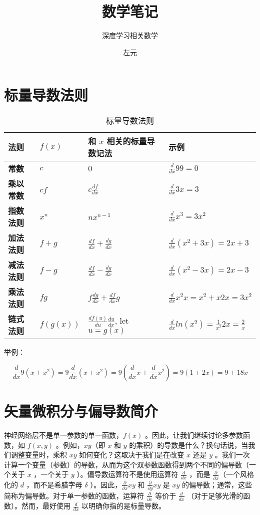 \documentclass[lang=cn,newtx,10pt,scheme=chinese]{elegantbook}
\title{数学笔记}
\subtitle{深度学习相关数学}
\author{左元}
\begin{document}
\maketitle
\frontmatter

\tableofcontents

\mainmatter

\chapter{标量导数法则}

\begin{table}[htbp]
\caption{标量导数法则}
\centering
\begin{tabular}{llll}
\toprule
{\bf 法则}&{\bf $f(x)$}&{\bf 和 $x$ 相关的标量导数记法}&{\bf 示例}\\
\midrule
{\bf 常数}&$c$&$0$&$\frac{d}{dx}99 = 0$\\[0.2em]
{\bf 乘以常数}&$cf$&$c \frac{df}{dx}$&$\frac{d}{dx}3x = 3$\\[0.2em]
{\bf 指数法则}&$x^n$&$nx^{n-1}$&$\frac{d}{dx}x^3 = 3x^2$\\[0.2em]
{\bf 加法法则}&$f + g$&$\frac{df}{dx} + \frac{dg}{dx}$&$\frac{d}{dx} (x^2 + 3x) = 2x + 3$\\[0.2em]
{\bf 减法法则}&$f - g$&$\frac{df}{dx} - \frac{dg}{dx}$&$\frac{d}{dx}(x^2 - 3x) = 2x - 3$\\[0.2em]
{\bf 乘法法则}&$fg$&$f \frac{dg}{dx} + \frac{df}{dx} g$&$\frac{d}{dx}x^2x = x^2 + x2x = 3x^2$\\[0.2em]
{\bf 链式法则}&$f(g(x))$&$\frac{df(u)}{du}\frac{du}{dx}$,  let $u=g(x)$&$\frac{d}{dx} ln(x^2) = \frac{1}{x^2}2x = \frac{2}{x}$\\[0.2em]
\bottomrule
\end{tabular}
\end{table}

举例：

\[
\frac{d}{dx} 9(x + x^2) = 9 \frac{d}{dx}(x + x^2) = 9 (\frac{d}{dx}x + \frac{d}{dx}x^2) = 9(1 + 2x) = 9 + 18x
\]

\chapter{矢量微积分与偏导数简介}

神经网络层不是单一参数的单一函数，$f(x)$ 。因此，让我们继续讨论多参数函数，如 $f(x, y)$ 。例如，$xy$（即 $x$ 和 $y$ 的乘积）的导数是什么？换句话说，当我们调整变量时，乘积 $xy$ 如何变化？这取决于我们是在改变 $x$ 还是 $y$ 。我们一次计算一个变量（参数）的导数，从而为这个双参数函数得到两个不同的偏导数（一个关于 $x$ ，一个关于 $y$ ）。偏导数运算符不是使用运算符 $\frac{d}{dx}$ ，而是 $\frac{\partial}{\partial x}$（一个风格化的 $d$ ，而不是希腊字母 $\delta$ ）。因此，$\frac{\partial}{\partial x}xy$ 和 $\frac{\partial}{\partial y}xy$ 是 $xy$ 的偏导数；通常，这些简称为偏导数。对于单一参数的函数，运算符 $\frac{\partial}{\partial x}$ 等价于 $\frac{d}{dx}$ （对于足够光滑的函数）。然而，最好使用 $\frac{d}{dx}$ 以明确你指的是标量导数。
\end{document}
